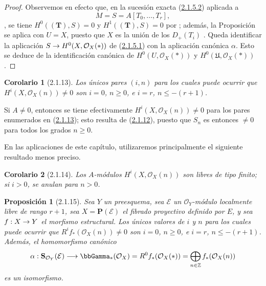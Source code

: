 \documentclass[10pt,oneside,openany]{book}
\theoremstyle{egaenv}\newtheorem*{env}{---}
\theoremstyle{egastatement}
\newtheorem*{proposition}{Proposición}
\newtheorem*{corollary}{Corolario}
\theoremstyle{egadescription}
\renewcommand{\leq}{\leqslant}
\renewcommand{\geq}{\geqslant}
\renewcommand{\to}{\mathchoice{\longrightarrow}{\rightarrow}{\rightarrow}{\rightarrow}}
\begin{document}
\begin{proof}
Observemos en efecto que, en la sucesión exacta
(\hyperref[III.2.1.5.2-fr]{2.1.5.2}) aplicada a
\[
M=S=A[T_0,\ldots,T_r],
\],
se tiene
$H^0((\mathbf T),S)=0$ y $H^1((\mathbf T),S)=0$ por ; además, la Proposición~ se aplica con $U=X$, puesto que $X$ es la unión de los $D_+(T_i)$ .
Queda identificar la aplicación $S\to H^0(X,\mathcal O_X(*))$ de (\hyperref[III.2.1.5.2]{2.1.5.1}) con la aplicación canónica $\alpha$.
Esto se deduce de la identificación canónica de $H^0(U,\mathcal O_X(*))$ y $H^0(\mathfrak U,\mathcal O_X(*))$.
\end{proof}

\begin{corollary}[2.1.13]
\label{III.2.1.13}
\label{III.2.1.13-fr}
Los únicos pares $(i,n)$ para los cuales puede ocurrir que $H^i(X,\mathcal O_X(n))\neq0$ son $i=0$, $n\geq0$, e $i=r$, $n\leq-(r+1)$.
\end{corollary}

Si $A\neq0$, entonces se tiene efectivamente $H^i(X,\mathcal O_X(n))\neq0$ para los pares enumerados en
(\hyperref[III.2.1.13-fr]{2.1.13}); esto resulta de
(\hyperref[III.2.1.12-fr]{2.1.12}), puesto que $S_n$ es entonces $\neq0$ para
todos los grados $n\geq0$.

En las aplicaciones de este capítulo, utilizaremos principalmente el siguiente resultado menos preciso.

\begin{corollary}[2.1.14]
\label{III.2.1.14}
\label{III.2.1.14-fr}
Los $A$-módulos $H^i(X,\mathcal O_X(n))$ son libres de tipo finito; si $i>0$, se anulan para $n>0$.
\end{corollary}

\begin{proposition}[2.1.15]
\label{III.2.1.15}
\label{III.2.1.15-fr}
Sea $Y$ un preesquema, sea $\mathcal E$ un $\mathcal O_Y$-módulo localmente libre de rango $r+1$, sea $X=\mathbf P(\mathcal E)$ el fibrado proyectivo definido por $E$, y sea $f:X\to Y$ el morfismo estructural.
Los únicos valores de $i$ y $n$ para los cuales puede ocurrir que $R^if_*(\mathcal O_X(n))\neq0$ son $i=0$, $n\geq0$, e $i=r$, $n\leq-(r+1)$.
Además, el homomorfismo canónico 
\[
\alpha:\mathbf S_{\mathcal O_Y}(\mathcal E)
\longrightarrow\bbGamma_*(\mathcal O_X)
=R^0f_*(\mathcal O_X(*))
=\bigoplus_{n\in\mathbb Z}f_*(\mathcal O_X(n))
\]
es un isomorfismo.
\end{proposition}
\end{document}
